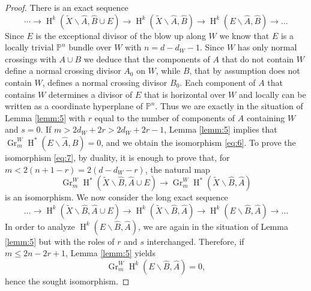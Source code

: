 \documentclass[11pt,a4paper]{amsart}
\renewcommand{\P}{\mathds{P}}
\DeclareMathOperator {\Gr} {Gr}
\DeclareMathOperator{\rH}{H}
\numberwithin{equation}{section}
\theoremstyle{plain}
\theoremstyle{definition}
\begin{document}
\begin{proof}
   There is an exact sequence
\begin{displaymath}
  \cdots\rightarrow\rH^{k}(\widetilde X\smallsetminus \widehat A,
        \widehat B\cup E)\longrightarrow 
       \rH^{k}(\widetilde X\smallsetminus \widehat A,
       \widehat B)
       \longrightarrow
       \rH^{k}(E\smallsetminus \widehat A,
       \widehat B)\longrightarrow \dots
\end{displaymath}
Since $E$ is the exceptional divisor of the blow up along $W$ we know
that $E$ is a locally trivial $\P^{n}$ bundle over $W$ with
$n=d-d_{W}-1$. Since $W$ has only normal crossings with $A\cup B$ we
deduce that the components of $A$ that do not contain $W$ define a
normal crossing divisor $A_{0}$ on $W$, while $B$, that by assumption
does not contain $W$, defines a normal crossing divisor
$B_{0}$. Each component of $A$ that contains $W$ determines a divisor
of $E$ that is horizontal over $W$ and locally can be written as a
coordinate hyperplane of $\P^{n}$. Thus we are
exactly in the situation of Lemma \ref{lemm:5} with $r$ equal to the
number of components of $A$ containing $W$ and $s=0$. If
$m>2d_{W}+2r> 2d_{W}+2r-1$, Lemma \ref{lemm:5} implies that
$\Gr_{m}^{W}\rH^{\ast}(E\smallsetminus \widehat A,\widehat B)=0$, and we obtain
the isomorphism \eqref{eq:6}. To prove the isomorphism \eqref{eq:7},
by duality, it is enough to prove that, for $m<2(n+1-r)=2(d-d_{W}-r)$,
the natural map
 \begin{equation}\label{eq:11}
     \Gr_{m}^{W}\rH^{\ast}(\widetilde X\smallsetminus \widehat B,
        \widehat A\cup E)\longrightarrow 
       \Gr_{m}^{W}\rH^{\ast}(\widetilde X\smallsetminus \widehat
       B,\widehat A) 
     \end{equation}
     is an isomorphism.
     We now consider the long exact sequence
\begin{displaymath}
  \dots\longrightarrow\rH^{k}(\widetilde X\smallsetminus \widehat B,
        \widehat A\cup E)\longrightarrow 
       \rH^{k}(\widetilde X\smallsetminus \widehat B,
       \widehat A)
       \longrightarrow
       \rH^{k}(E\smallsetminus \widehat B,
       \widehat A)\longrightarrow \dots
\end{displaymath}
In order to analyze $\rH^{k}(E\smallsetminus \widehat B, \widehat A)$,
we are again in the situation of Lemma \ref{lemm:5} but with the roles
of $r$ and $s$ interchanged. Therefore, if $m\le 2n-2r+1$, Lemma \ref{lemm:5} yields
\begin{displaymath}
\Gr_{m}^{W}       \rH^{k}(E\smallsetminus \widehat B,
       \widehat A)=0,
\end{displaymath}
hence the sought isomorphism.
 \end{proof}
\end{document}
